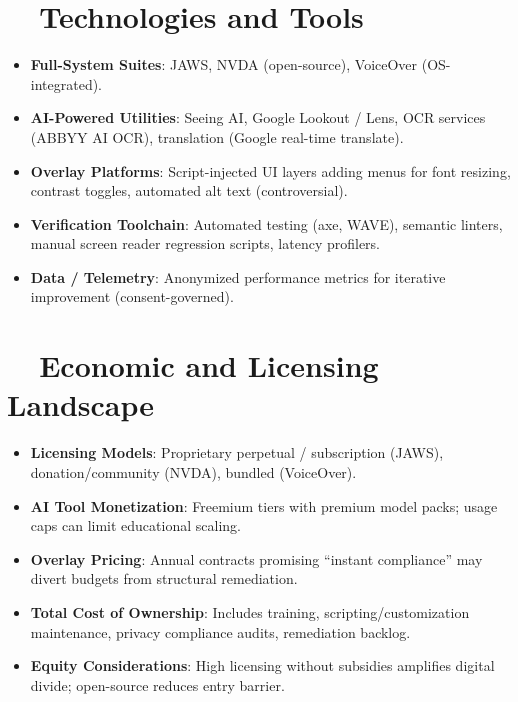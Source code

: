 \section{~~Technologies and Tools}
\label{sec:ch28-technologies}
\begin{itemize}
	\item \textbf{Full-System Suites}: JAWS\supercite{JAWS2023}, NVDA\supercite{NVDA2023} (open-source), VoiceOver\supercite{VoiceOver2023} (OS-integrated).
	\item \textbf{AI-Powered Utilities}: Seeing AI\supercite{msseeingai}, Google Lookout / Lens, OCR services (ABBYY AI OCR\supercite{ABBYYAIOCR}), translation (Google real-time translate\supercite{GoogleTranslateRealtime}).
	\item \textbf{Overlay Platforms}: Script-injected UI layers adding menus for font resizing, contrast toggles, automated alt text (controversial\supercite{AccessiBe2024, UserWay2024}).
	\item \textbf{Verification Toolchain}: Automated testing (axe, WAVE), semantic linters, manual screen reader regression scripts, latency profilers.
	\item \textbf{Data / Telemetry}: Anonymized performance metrics for iterative improvement (consent-governed).
\end{itemize}

\section{~~Economic and Licensing Landscape}
\label{sec:ch28-economics}
\begin{itemize}
	\item \textbf{Licensing Models}: Proprietary perpetual / subscription (JAWS), donation/community (NVDA), bundled (VoiceOver).
	\item \textbf{AI Tool Monetization}: Freemium tiers with premium model packs; usage caps can limit educational scaling.
	\item \textbf{Overlay Pricing}: Annual contracts promising “instant compliance” may divert budgets from structural remediation.
	\item \textbf{Total Cost of Ownership}: Includes training, scripting/customization maintenance, privacy compliance audits, remediation backlog.
	\item \textbf{Equity Considerations}: High licensing without subsidies amplifies digital divide; open-source reduces entry barrier\supercite{Burgstahler2015}.
\end{itemize}

